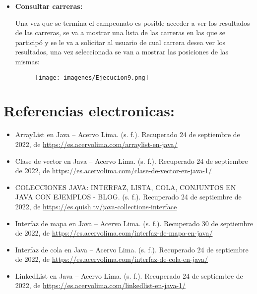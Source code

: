 \documentclass[12pt, letterpaper]{article} %
\begin{document}
\begin{itemize}
    \item \textbf{Consultar carreras:}
    
    Una vez que se termina el campeonato es posible acceder a ver los resultados de las carreras, se va a mostrar una lista de las carreras en las que se participó y se le va a solicitar al usuario de cual carrera desea ver los resultados, una vez seleccionada se van a mostrar las posiciones de las mismas:
    
    \begin{figure}[h]
        \centering
        \texttt{[image: imagenes/Ejecucion9.png]}
        \label{fig:e9}
    \end{figure}
\end{itemize}

\section*{Referencias electronicas:}
\begin{itemize}
    \item ArrayList en Java – Acervo Lima. (s. f.). Recuperado 24 de septiembre de 2022, de \href{https://bit.ly/3fB4HAN}{https://es.acervolima.com/arraylist-en-java/}
    
    \item Clase de vector en Java – Acervo Lima. (s. f.). Recuperado 24 de septiembre de 2022, de \href{https://es.acervolima.com/clase-de-vector-en-java-1/}{https://es.acervolima.com/clase-de-vector-en-java-1/}
    
    \item COLECCIONES JAVA: INTERFAZ, LISTA, COLA, CONJUNTOS EN JAVA CON EJEMPLOS - BLOG. (s. f.). Recuperado 24 de septiembre de 2022, de \href{https://es.quish.tv/java-collections-interface}{https://es.quish.tv/java-collections-interface}
    
    \item Interfaz de mapa en Java – Acervo Lima. (s. f.). Recuperado 30 de septiembre de 2022, de \href{https://es.acervolima.com/interfaz-de-mapa-en-java/}{https://es.acervolima.com/interfaz-de-mapa-en-java/}
    
    \item Interfaz de cola en Java – Acervo Lima. (s. f.). Recuperado 24 de septiembre de 2022, de \href{https://es.acervolima.com/interfaz-de-cola-en-java/}{https://es.acervolima.com/interfaz-de-cola-en-java/}
    
    \item LinkedList en Java – Acervo Lima. (s. f.). Recuperado 24 de septiembre de 2022, de \href{https://es.acervolima.com/linkedlist-en-java-1/}{https://es.acervolima.com/linkedlist-en-java-1/}
\end{itemize}
\end{document}
